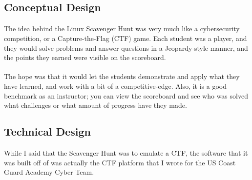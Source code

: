 \documentclass[11pt]{article}
\begin{document}
	\begin{center}
		\graphicspath{ {.} }
		\centering
	\end{center}


	\subsection{Conceptual Design}

	\paragraph{} The idea behind the Linux Scavenger Hunt was very much like a cybersecurity competition, or a Capture-the-Flag (CTF) game. Each student was a player, and they would solve problems and answer questions in a Jeopardy-style manner, and the points they earned were visible on the scoreboard.

	\paragraph{} The hope was that it would let the students demonstrate and apply what they have learned, and work with a bit of a competitive-edge. Also, it is a good benchmark as an instructor; you can view the scoreboard and see who was solved what challenges or what amount of progress have they made.


	\subsection{Technical Design}

	\paragraph{} While I said that the Scavenger Hunt was to emulate a CTF, the software that it was built off of was actually the CTF platform that I wrote for the US Coast Guard Academy Cyber Team. 
\end{document}
